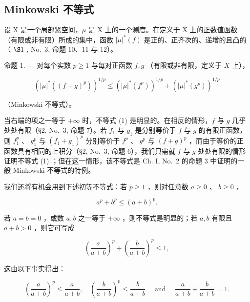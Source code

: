 \subsection{Minkowski 不等式}

设 X 是一个局部紧空间，\(\mu\) 是 X 上的一个测度。在定义于 X 上的正数值函数（有限或非有限）所成的集中，函数 \(|\mu|^{*}(f)\) 是正的、正齐次的、递增的且凸的（ \(\S1\) , No.~3, 命题 10、11 与 12）。

命题 1. --- 对每个实数 \(p \geqslant 1\) 与每对正函数 \(f, g\) （有限或非有限，定义于 \(X\) 上），

\[
\left(| \mu | ^ {*} ((f + g) ^ {p})\right) ^ {1 / p} \leqslant \left(| \mu | ^ {*} (f ^ {p})\right) ^ {1 / p} + \left(| \mu | ^ {*} (g ^ {p})\right) ^ {1 / p}\tag{1}
\]

（Minkowski 不等式）。

当右端的项之一等于 \(+\infty\) 时，不等式 (1) 是明显的。在相反的情形，\(f\) 与 \(g\) 几乎处处有限（§2, No.~3, 命题 7）。若 \(f_1\) 与 \(g_1\) 是分别等价于 \(f\) 与 \(g\) 的有限正函数，则 \(f_1^p\) 、 \(g_1^p\) 与 \((f_1 + g_1)^p\) 分别等价于 \(f^p\) 、 \(g^p\) 与 \((f + g)^p\) ，而由于等价的正函数具有相同的上积分（§2, No.~3, 命题 6），我们只需就 \(f\) 与 \(g\) 处处有限的情形证明不等式 (1) ；但在这一情形，该不等式是 Ch. I, No.~2 的命题 3 中证明的一般 Minkowski 不等式的特例。

我们还将有机会用到下述初等不等式：若 \(p \geqslant 1\) ，则对任意数 \(a \geqslant 0\) 、 \(b \geqslant 0\) ，

\[
a ^ {p} + b ^ {p} \leqslant (a + b) ^ {p}.\tag{2}
\]

若 \(a = b = 0\) ，或数 \(a, b\) 之一等于 \(+\infty\) ，则不等式是明显的；若 \(a, b\) 有限且 \(a + b > 0\) ，则它可写成

\[
\left(\frac {a}{a + b}\right) ^ {p} + \left(\frac {b}{a + b}\right) ^ {p} \leqslant 1,
\]

这由以下事实得出：

\[
\left(\frac {a}{a + b}\right) ^ {p} \leqslant \frac {a}{a + b}, \quad \left(\frac {b}{a + b}\right) ^ {p} \leqslant \frac {b}{a + b} \quad \text { and } \quad \frac {a}{a + b} + \frac {b}{a + b} = 1.
\]

